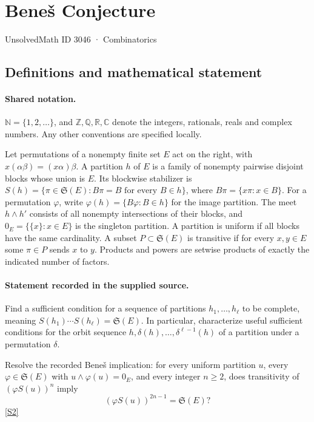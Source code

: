 \documentclass[11pt]{article}
\newcommand{\sref}[2]{\hyperlink{source:#1:#2}{[S#2]}}
\begin{document}
\setcounter{section}{3045}
\section{Beneš Conjecture}\label{3046}
{\small\sffamily UnsolvedMath ID 3046 · Combinatorics}
\subsection{Definitions and mathematical statement}

\paragraph{Shared notation.}$\mathbb N=\{1,2,\ldots\}$, and $\mathbb Z,\mathbb Q,\mathbb R,\mathbb C$ denote the integers, rationals, reals and complex numbers. Any other conventions are specified locally.


Let permutations of a nonempty finite set $E$ act on the right, with $x(\alpha\beta)=(x\alpha)\beta$. A partition $h$ of $E$ is a family of nonempty pairwise disjoint blocks whose union is $E$. Its blockwise stabilizer is
$S(h)=\{\pi\in\mathfrak S(E):B\pi=B\text{ for every }B\in h\}$, where $B\pi=\{x\pi:x\in B\}$.
For a permutation $\varphi$, write $\varphi(h)=\{B\varphi:B\in h\}$ for the image partition. The meet $h\wedge h'$ consists of all nonempty intersections of their blocks, and $0_E=\{\{x\}:x\in E\}$ is the singleton partition. A partition is uniform if all blocks have the same cardinality. A subset $P\subset\mathfrak S(E)$ is transitive if for every $x,y\in E$ some $\pi\in P$ sends $x$ to $y$. Products and powers are setwise products of exactly the indicated number of factors.
\paragraph{Statement recorded in the supplied source.}
Find a sufficient condition for a sequence of partitions $h_1,\ldots,h_\ell$ to be complete, meaning $S(h_1)\cdots S(h_\ell)=\mathfrak S(E)$. In particular, characterize useful sufficient conditions for the orbit sequence $h,\delta(h),\ldots,\delta^{\ell-1}(h)$ of a partition under a permutation $\delta$.

Resolve the recorded Beneš implication: for every uniform partition $u$, every $\varphi\in\mathfrak S(E)$ with $u\wedge\varphi(u)=0_E$, and every integer $n\geq2$, does transitivity of $(\varphi S(u))^n$ imply
\[
 (\varphi S(u))^{2n-1}=\mathfrak S(E)?
\] \sref{3046}{2}
\end{document}
